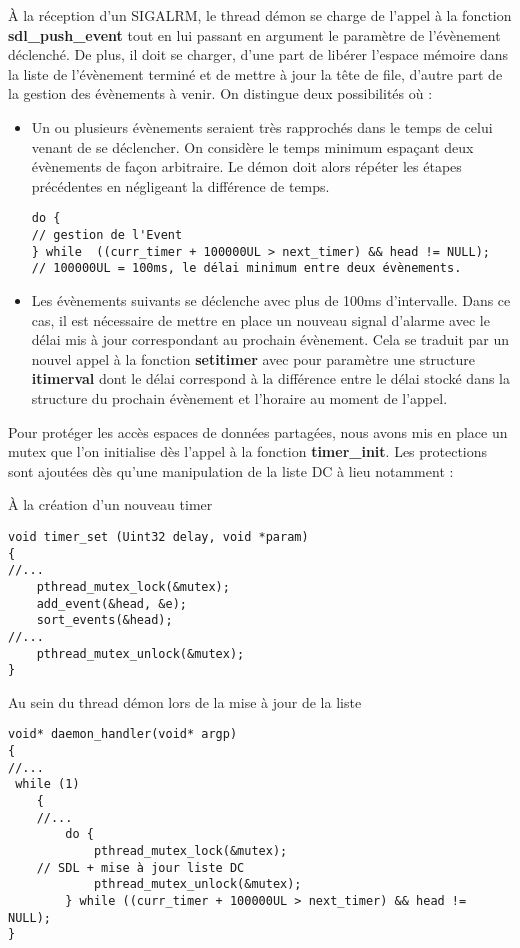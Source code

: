 \documentclass[a4paper]{article}
\begin{document}
À la réception d'un SIGALRM, le thread démon se charge de l'appel à la fonction \textbf{sdl\_push\_event} tout en lui passant en argument le paramètre de l'évènement déclenché. De plus, il doit se charger, d'une part de libérer l'espace mémoire dans la liste de l'évènement terminé et de mettre à jour la tête de file, d'autre part de la gestion des évènements à venir. On distingue deux possibilités où : 

\begin{itemize}
\item Un ou plusieurs évènements seraient très rapprochés dans le temps de celui venant de se déclencher. On considère le temps minimum espaçant  deux évènements de façon arbitraire. Le démon doit alors répéter les étapes précédentes en négligeant la différence de temps.
\begin{verbatim}
do { 
// gestion de l'Event
} while  ((curr_timer + 100000UL > next_timer) && head != NULL); 
// 100000UL = 100ms, le délai minimum entre deux évènements.
\end{verbatim}

\item Les évènements suivants se déclenche avec plus de 100ms d'intervalle. Dans ce cas, il est nécessaire de mettre en place un nouveau signal d'alarme avec le délai mis à jour correspondant au prochain évènement. Cela se traduit par un nouvel appel à la fonction \textbf{setitimer} avec pour paramètre une structure \textbf{itimerval} dont le délai correspond à la différence entre le délai stocké dans la structure du prochain évènement et l'horaire au moment de l'appel.
\end{itemize}

Pour protéger les accès espaces de données partagées, nous avons mis en place un mutex que l'on initialise dès l'appel à la fonction \textbf{timer\_init}. Les protections sont ajoutées dès qu'une manipulation de la liste DC à lieu notamment :

À la création d'un nouveau timer
\begin{verbatim}
void timer_set (Uint32 delay, void *param)
{
//...
    pthread_mutex_lock(&mutex);
    add_event(&head, &e);
    sort_events(&head);
//...
    pthread_mutex_unlock(&mutex);
}
\end{verbatim}

Au sein du thread démon lors de la mise à jour de la liste
\begin{verbatim}
void* daemon_handler(void* argp)
{
//...
 while (1)
    {
	//...
        do {
            pthread_mutex_lock(&mutex);
	// SDL + mise à jour liste DC
            pthread_mutex_unlock(&mutex);
        } while ((curr_timer + 100000UL > next_timer) && head != NULL);
}
\end{verbatim}
\end{document}

